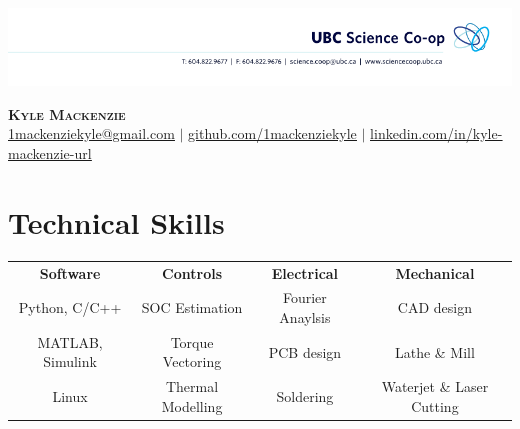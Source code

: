 \documentclass[letterpaper,11pt]{article}
\begin{document}

\begin{center}
\vspace*{-1.5cm}
    \centerline{\includegraphics[width=\paperwidth]{head}}
    \textbf{\Huge \scshape Kyle Mackenzie} \\ \vspace{1pt}
    \href{mailto:1mackenziekyle@gmail.com}{\underline{1mackenziekyle@gmail.com}} $|$
    \small \href{https://github.com/1mackenziekyle}{\underline{github.com/1mackenziekyle}} $|$
    \href{https://www.linkedin.com/in/kyle-mackenzie-url/}{\underline{linkedin.com/in/kyle-mackenzie-url}}  
    
    
\end{center}

 
  
%
\section{Technical Skills}
\begin{center}
    \begin{tabular*}{\textwidth}{@{\extracolsep{\fill}}cccc}
        \textbf{Software} & \textbf{Controls} & \textbf{Electrical} & \textbf{Mechanical} \\
        Python, C/C++ & SOC Estimation & Fourier Anaylsis & CAD design \\
        MATLAB, Simulink & Torque Vectoring & PCB design & Lathe \& Mill \\
        Linux & Thermal Modelling & Soldering & Waterjet \& Laser Cutting \\
    \end{tabular*}
\end{center}
\end{document}
